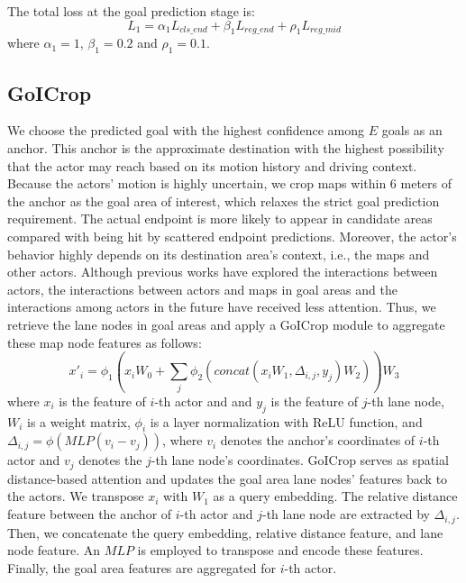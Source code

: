 The total loss at the goal prediction stage is:
\begin{equation}
	L_{1} = \alpha_1 L_{cls\_end} + \beta_1 L_{reg\_end} +\rho_1 L_{reg\_mid}
\end{equation}
where $\alpha_1 = 1$, $\beta_1 = 0.2$ and $\rho_1 = 0.1$.

\subsection{GoICrop}
We choose the predicted goal with the highest confidence among $E$ goals as an anchor. This anchor is the approximate destination with the highest possibility that the actor may reach based on its motion history and driving context.
Because the actors' motion is highly uncertain, we crop maps within 6 meters of the anchor as the goal area of interest, which relaxes the strict goal prediction requirement. The actual endpoint is more likely to appear in candidate areas compared with being hit by scattered endpoint predictions.
Moreover, the actor's behavior highly depends on its destination area's context, i.e., the maps and other actors. Although previous works have explored the interactions between actors, the interactions between actors and maps in goal areas and the interactions among actors in the future have received less attention. 
Thus, we retrieve the lane nodes in goal areas and apply a GoICrop module to aggregate these map node features as follows:
\begin{equation}
	x'_i = \phi_1(x_iW_0+\sum_j\phi_2(concat(x_iW_1,\Delta_{i,j},y_j)W_2))W_3
	\label{att}
\end{equation}
where $x_i$ is the feature of $i$-th actor and and $y_j$ is the feature of $j$-th lane node, $W_i$ is a weight matrix, $\phi_i$ is a layer normalization with ReLU function, and $\Delta_{i,j}=\phi(MLP(v_i-v_j))$, where $v_i$ denotes the anchor's coordinates of $i$-th actor and $v_j$ denotes the $j$-th lane node's coordinates. 
GoICrop serves as spatial distance-based attention and updates the goal area lane nodes' features back to the actors. We transpose $x_i$ with $W_1$ as a query embedding. The relative distance feature between the anchor of $i$-th actor and $j$-th lane node are extracted by $\Delta_{i,j}$. Then, we concatenate the query embedding, relative distance feature, and lane node feature. An $MLP$ is employed to transpose and encode these features. Finally, the goal area features are aggregated for $i$-th actor.

